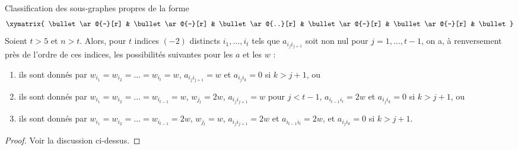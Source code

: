 \begin{lemma}
\label{lemma-long}
Classification des sous-graphes propres de la forme
$$
\xymatrix{
\bullet \ar@{-}[r] &
\bullet \ar@{-}[r] &
\bullet \ar@{..}[r] &
\bullet \ar@{-}[r] &
\bullet \ar@{-}[r] &
\bullet
}
$$
Soient $t > 5$ et $n > t$. Alors, pour $t$ indices $(-2)$ distincts
$i_1, \ldots, i_t$ tels que $a_{i_ji_{j + 1}}$ soit non nul pour
$j = 1, \ldots, t - 1$, on a, à renversement près de l'ordre de ces indices,
les possibilités suivantes pour les $a$ et les $w$ :
\begin{enumerate}
\item
\label{item-An}
ils sont donnés par $w_{i_1} = w_{i_2} = \ldots = w_{i_t} = w$,
$a_{i_ji_{j + 1}} = w$ et $a_{i_ji_k} = 0$ si $k > j + 1$, ou
\item
\label{item-Cn}
ils sont donnés par $w_{i_1} = w_{i_2} = \ldots = w_{i_{t - 1}} = w$,
$w_{j_t} = 2w$, $a_{i_ji_{j + 1}} = w$ pour $j < t - 1$,
$a_{i_{t - 1}i_t} = 2w$ et $a_{i_ji_k} = 0$ si $k > j + 1$, ou
\item
\label{item-Bn}
ils sont donnés par $w_{i_1} = w_{i_2} = \ldots = w_{i_{t - 1}} = 2w$,
$w_{j_t} = w$, $a_{i_ji_{j + 1}} = 2w$ et
$a_{i_{t - 1}i_t} = 2w$, et $a_{i_ji_k} = 0$ si $k > j + 1$.
\end{enumerate}
\end{lemma}

\begin{proof}
Voir la discussion ci-dessus.
\end{proof}

